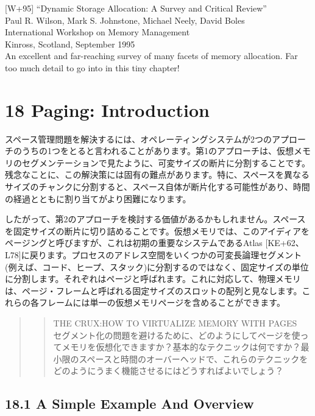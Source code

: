 {[}W+95{]} ``Dynamic Storage Allocation: A Survey and Critical
Review''\\
Paul R. Wilson, Mark S. Johnstone, Michael Neely, David Boles\\
International Workshop on Memory Management\\
Kinross, Scotland, September 1995\\
An excellent and far-reaching survey of many facets of memory
allocation. Far too much detail to go into in this tiny chapter!

\hypertarget{paging-introduction}{%
\section*{18 Paging: Introduction}\label{paging-introduction}}

スペース管理問題を解決するには、オペレーティングシステムが2つのアプローチのうちの1つをとると言われることがあります。第1のアプローチは、仮想メモリのセグメンテーションで見たように、可変サイズの断片に分割することです。残念なことに、この解決策には固有の難点があります。特に、スペースを異なるサイズのチャンクに分割すると、スペース自体が断片化する可能性があり、時間の経過とともに割り当てがより困難になります。

したがって、第2のアプローチを検討する価値があるかもしれません。スペースを固定サイズの断片に切り詰めることです。仮想メモリでは、このアイディアをページングと呼びますが、これは初期の重要なシステムであるAtlas
{[}KE+62、L78{]}に戻ります。プロセスのアドレス空間をいくつかの可変長論理セグメント(例えば、コード、ヒープ、スタック)に分割するのではなく、固定サイズの単位に分割します。それぞれはページと呼ばれます。これに対応して、物理メモリは、ページ・フレームと呼ばれる固定サイズのスロットの配列と見なします。これらの各フレームには単一の仮想メモリページを含めることができます。

\begin{quote}
\begin{quote}
THE CRUX:HOW TO VIRTUALIZE MEMORY WITH PAGES\\
セグメント化の問題を避けるために、どのようにしてページを使ってメモリを仮想化できますか？基本的なテクニックは何ですか？最小限のスペースと時間のオーバーヘッドで、これらのテクニックをどのようにうまく機能させるにはどうすればよいでしょう？
\end{quote}
\end{quote}

\hypertarget{a-simple-example-and-overview}{%
\subsection*{18.1 A Simple Example And
Overview}\label{a-simple-example-and-overview}}

